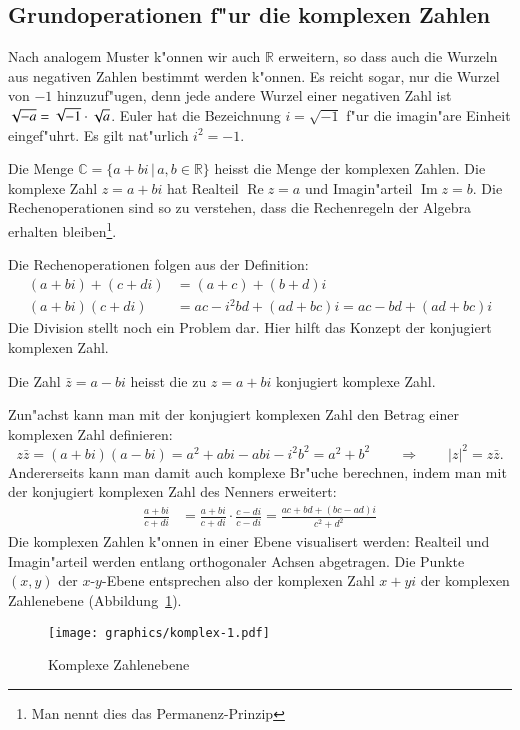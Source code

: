 \subsection{Grundoperationen f"ur die komplexen Zahlen}
Nach analogem Muster k"onnen wir auch $\mathbb R$ erweitern, so dass auch
die Wurzeln aus negativen Zahlen bestimmt werden k"onnen. Es reicht
sogar, nur die Wurzel von $-1$ hinzuzuf"ugen, denn jede andere Wurzel
einer negativen Zahl ist $\sqrt{-a}=\sqrt{-1}\cdot\sqrt{\mathstrut a}$.
Euler hat die Bezeichnung $i=\sqrt{-1}$ f"ur die imagin"are Einheit eingef"uhrt.
Es gilt nat"urlich $i^2=-1$.

\begin{definition}
Die Menge $\mathbb C=\{a+bi\,|\,a,b\in\mathbb R\}$ heisst die Menge der
komplexen Zahlen. Die komplexe Zahl $z=a+bi$ hat
Realteil $\operatorname{Re}z=a$ und Imagin"arteil $\operatorname{Im}z=b$.
Die Rechenoperationen sind so zu verstehen, dass die Rechenregeln
der Algebra erhalten bleiben\footnote{Man nennt dies das Permanenz-Prinzip}.
\end{definition}

Die Rechenoperationen folgen aus der Definition:
\begin{align*}
(a+bi)+(c+di)&=(a+c)+(b+d)i\\
(a+bi)(c+di)&=ac-i^2bd+(ad+bc)i=ac-bd+(ad+bc)i
\end{align*}
Die Division stellt noch ein Problem dar. Hier hilft das Konzept der
konjugiert komplexen Zahl.

\begin{definition}
Die Zahl $\bar z=a-bi$ heisst die zu $z=a+bi$ konjugiert komplexe Zahl.
\end{definition}

Zun"achst kann man mit der konjugiert komplexen Zahl den Betrag einer
komplexen Zahl definieren:
\[
z\bar z=(a+bi)(a-bi)=a^2+abi-abi-i^2b^2=a^2+b^2\qquad\Rightarrow\qquad
|z|^2=z\bar z.
\]
Andererseits kann man damit auch komplexe Br"uche berechnen, indem man
mit der konjugiert komplexen Zahl des Nenners erweitert:
\begin{align*}
\frac{a+bi}{c+di}&=
\frac{a+bi}{c+di}
\cdot
\frac{c-di}{c-di}=\frac{ac+bd+(bc-ad)i}{c^2+d^2}
\end{align*}
Die komplexen Zahlen k"onnen in einer Ebene visualisert werden: 
Realteil und Imagin"arteil werden entlang orthogonaler Achsen abgetragen.
Die Punkte $(x,y)$ der $x$-$y$-Ebene entsprechen also der komplexen Zahl
$x+yi$ der komplexen Zahlenebene (Abbildung~\ref{skript:gaussebene}).
\begin{figure}
\centering
\texttt{[image: graphics/komplex-1.pdf]}
\caption{Komplexe Zahlenebene
\label{skript:gaussebene}}
\end{figure}

